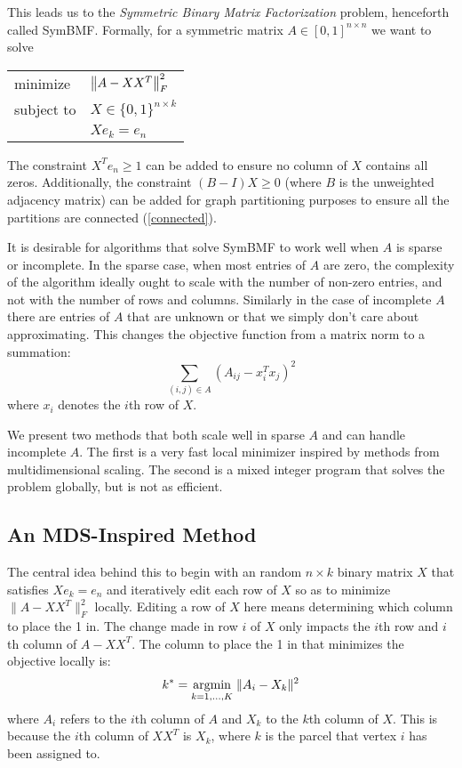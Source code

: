 This leads us to the \textit{Symmetric Binary Matrix Factorization}
problem, henceforth called SymBMF. Formally, for a symmetric matrix
$A \in [0, 1]^{n \times n}$ we want to solve
\begin{center}
\begin{tabular}{l l}
minimize   & $\left\lVert A - X X^T\right\rVert_F^2$ \\
subject to & $X \in \{0, 1\}^{n \times k}$ \\
           & $X e_k = e_n$
\end{tabular}
\end{center}
The constraint $X^T e_n \geq 1$ can be added to ensure no column of $X$
contains all zeros. Additionally, the constraint $(B - I) X \geq 0$
(where $B$ is the unweighted adjacency matrix) can be added for graph
partitioning purposes to ensure all the partitions are connected
(\ref{connected}).

It is desirable for algorithms that solve SymBMF to work well when $A$
is sparse or incomplete. In the sparse case, when most entries of $A$
are zero, the complexity of the algorithm ideally ought to scale with
the number of non-zero entries, and not with the number of rows and
columns. Similarly in the case of incomplete $A$ there are entries of
$A$ that are unknown or that we simply don't care about approximating.
This changes the objective function from a matrix norm to a summation:
\[ \sum_{(i,j) \in A} (A_{ij} - x_i^T x_j)^2 \]
where $x_i$ denotes the $i$th row of $X$.

We present two methods that both scale well in sparse $A$ and can
handle incomplete $A$. The first is a very fast local minimizer
inspired by methods from multidimensional scaling. The second is a
mixed integer program that solves the problem globally, but is not
as efficient.

\subsection{An MDS-Inspired Method}

The central idea behind this to begin with an random $n \times k$
binary matrix $X$ that satisfies $X e_k = e_n$ and iteratively
edit each row of $X$ so as to minimize $\|A - X X^T\|_F^2$ locally.
Editing a row of $X$ here means determining which column to place the 1
in. The change made in row $i$ of $X$ only impacts the $i$th row and
$i$th column of $A - X X^T$. The column to place the 1 in that minimizes
the objective locally is:
\begin{equation} \label{col_select}
k^* = \underset{k = 1,...,K}{\mathrm{arg min}}\; \|A_i - X_k\|^2
\end{equation}
where $A_i$ refers to the $i$th column of $A$ and $X_k$ to the $k$th
column of $X$. This is because the $i$th column of $X X^T$ is $X_k$,
where $k$ is the parcel that vertex $i$ has been assigned to.


